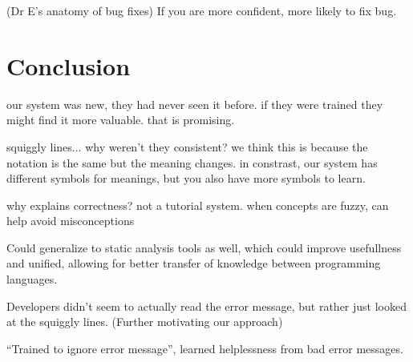 \documentclass[conference]{IEEEtran}
\begin{document}
(Dr E's anatomy of bug fixes) If you are more confident, more likely to fix bug.








\section{Conclusion}

our system was new, they had never seen it before. if they were trained they might find it more valuable. that is promising.

squiggly lines... why weren't they consistent? we think this is because the notation is the same but the meaning changes. in constrast, our system has different symbols for meanings, but you also have more symbols to learn.

why explains correctness? not a tutorial system. when concepts are fuzzy, can help avoid misconceptions

Could generalize to static analysis tools as well, which could improve usefullness and unified, allowing for better transfer of knowledge between programming languages.

Developers didn't seem to actually read the error message, but rather just looked at the squiggly lines.  (Further motivating our approach)

``Trained to ignore error message'', learned helplessness from bad error messages.

%
%
\end{document}
